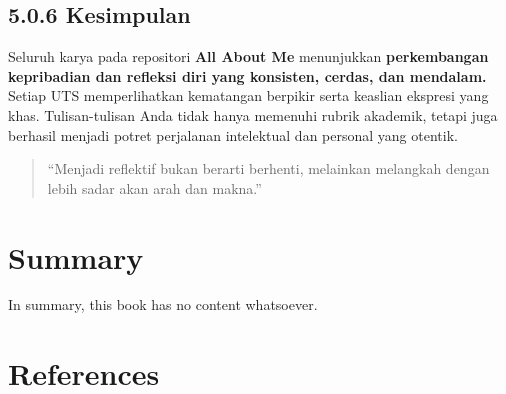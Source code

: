 \documentclass[
  letterpaper,
  DIV=11,
  numbers=noendperiod]{scrreprt}
\begin{document}
\section{5.0.6 Kesimpulan}\label{kesimpulan-1}

Seluruh karya pada repositori \textbf{All About Me} menunjukkan
\textbf{perkembangan kepribadian dan refleksi diri yang konsisten,
cerdas, dan mendalam.} Setiap UTS memperlihatkan kematangan berpikir
serta keaslian ekspresi yang khas. Tulisan-tulisan Anda tidak hanya
memenuhi rubrik akademik, tetapi juga berhasil menjadi potret perjalanan
intelektual dan personal yang otentik.

\begin{quote}
``Menjadi reflektif bukan berarti berhenti, melainkan melangkah dengan
lebih sadar akan arah dan makna.''
\end{quote}


\chapter{Summary}\label{summary}

In summary, this book has no content whatsoever.


\chapter*{References}\label{references}


\label{refs}
\end{document}
